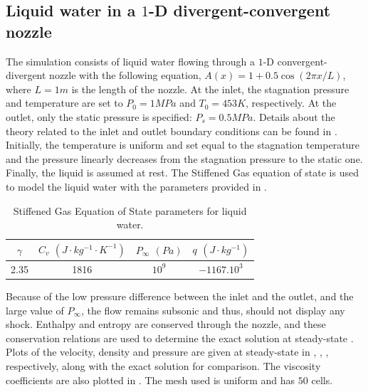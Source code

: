 \subsection{Liquid water in a $1$-D divergent-convergent nozzle} \label{sec:liquid_nozzle}
The simulation consists of liquid water flowing through a $1$-D convergent-divergent nozzle with the following equation, $A(x) = 1 + 0.5 \cos(2 \pi x / L)$, where $L=1m$ is the length of the nozzle. At the inlet,  the stagnation pressure and temperature are set to $P_0 = 1 MPa$ and $T_0 = 453 K$, respectively. At the outlet, only the static pressure is specified: $P_s = 0.5MPa$. Details about the theory related to the inlet and outlet boundary conditions can be found in \cite{SEM}. Initially, the temperature is uniform and set equal to the stagnation temperature and the pressure linearly decreases from the stagnation pressure to the static one. Finally, the liquid is assumed at rest. The Stiffened Gas equation of state is used to model the liquid water with the parameters provided in .
\begin{table}[H]
\begin{center}
 \caption{\label{tbl:stff_gas_eos_liq} Stiffened Gas Equation of State parameters for liquid water.}
 \begin{tabular}{|c|c|c|c|}
 \hline
$\gamma$ & $C_v$ $(J\cdot kg^{-1} \cdot K^{-1})$ & $P_{\infty}$ $(Pa)$ & $q$ $(J \cdot kg^{-1})$ \\
 \hline
2.35 & 1816 & $10^9$ & $-1167.10^3$   \\
  \hline
\end{tabular}
\end{center}
\end{table}
Because of the low pressure difference between the inlet and the outlet, and the large value of $P_{\infty}$, the flow remains subsonic and thus, should not display any shock. Enthalpy and entropy are conserved through the nozzle, and these conservation relations are used to determine the exact solution at steady-state \cite{nozzle_exact}.
Plots of the velocity, density and pressure are given at steady-state in , , , respectively, along with the exact solution for comparison. The viscosity coefficients are also plotted in . The mesh used is uniform and has $50$ cells.
